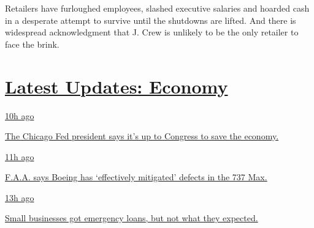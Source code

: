 Retailers have furloughed employees, slashed executive salaries and
hoarded cash in a desperate attempt to survive until the shutdowns are
lifted. And there is widespread acknowledgment that J. Crew is unlikely
to be the only retailer to face the brink.

\hypertarget{latest-updates-economy}{%
\section{\texorpdfstring{\href{https://www.nytimes3xbfgragh.onion/live/2020/08/03/business/stock-market-today-coronavirus?action=click\&pgtype=Article\&state=default\&region=MAIN_CONTENT_1\&context=storylines_live_updates}{Latest
Updates:
Economy}}{Latest Updates: Economy}}\label{latest-updates-economy}}

\href{https://www.nytimes3xbfgragh.onion/live/2020/08/03/business/stock-market-today-coronavirus?action=click\&pgtype=Article\&state=default\&region=MAIN_CONTENT_1\&context=storylines_live_updates\#the-chicago-fed-president-says-its-up-to-congress-to-save-the-economy}{10h
ago}

\href{https://www.nytimes3xbfgragh.onion/live/2020/08/03/business/stock-market-today-coronavirus?action=click\&pgtype=Article\&state=default\&region=MAIN_CONTENT_1\&context=storylines_live_updates\#the-chicago-fed-president-says-its-up-to-congress-to-save-the-economy}{The
Chicago Fed president says it's up to Congress to save the economy.}

\href{https://www.nytimes3xbfgragh.onion/live/2020/08/03/business/stock-market-today-coronavirus?action=click\&pgtype=Article\&state=default\&region=MAIN_CONTENT_1\&context=storylines_live_updates\#faa-says-boeing-has-effectively-mitigated-defects-in-the-737-max}{11h
ago}

\href{https://www.nytimes3xbfgragh.onion/live/2020/08/03/business/stock-market-today-coronavirus?action=click\&pgtype=Article\&state=default\&region=MAIN_CONTENT_1\&context=storylines_live_updates\#faa-says-boeing-has-effectively-mitigated-defects-in-the-737-max}{F.A.A.
says Boeing has `effectively mitigated' defects in the 737 Max.}

\href{https://www.nytimes3xbfgragh.onion/live/2020/08/03/business/stock-market-today-coronavirus?action=click\&pgtype=Article\&state=default\&region=MAIN_CONTENT_1\&context=storylines_live_updates\#small-businesses-got-emergency-loans-but-not-what-they-expected}{13h
ago}

\href{https://www.nytimes3xbfgragh.onion/live/2020/08/03/business/stock-market-today-coronavirus?action=click\&pgtype=Article\&state=default\&region=MAIN_CONTENT_1\&context=storylines_live_updates\#small-businesses-got-emergency-loans-but-not-what-they-expected}{Small
businesses got emergency loans, but not what they expected.}

